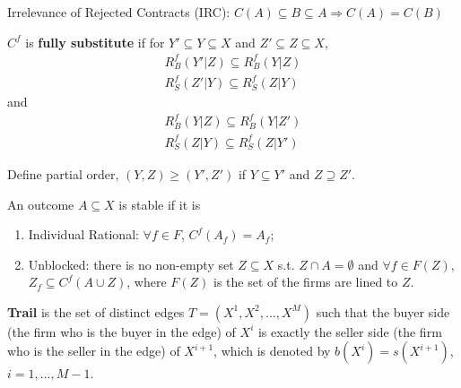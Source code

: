 \documentclass[11pt]{elegantbook}
\begin{document}
\begin{definition}
    \normalfont
    Irrelevance of Rejected Contracts (IRC): $C(A)\subseteq B\subseteq A \Rightarrow C(A)=C(B)$
\end{definition}

\begin{definition}
    \normalfont
    $C^f$ is \textbf{fully substitute} if for $Y'\subseteq Y\subseteq X$ and $Z'\subseteq Z\subseteq X$,
    \begin{equation}
        \begin{aligned}
            R_B^f(Y'|Z)\subseteq R_B^f(Y|Z)\\
            R_S^f(Z'|Y)\subseteq R_S^f(Z|Y)
        \end{aligned}
        \nonumber
    \end{equation}
    and
    \begin{equation}
        \begin{aligned}
            R_B^f(Y|Z)\subseteq R_B^f(Y|Z')\\
            R_S^f(Z|Y)\subseteq R_S^f(Z|Y')
        \end{aligned}
        \nonumber
    \end{equation}
\end{definition}
Define partial order, $(Y,Z)\geq (Y',Z')$ if $Y\subseteq Y'$ and $Z\supseteq  Z'$.


\begin{definition}
    \normalfont
    An outcome $A\subseteq X$ is stable if it is
    \begin{enumerate}
        \item Individual Rational: $\forall f\in F$, $C^f (A_f)=A_f$;
        \item Unblocked: there is no non-empty set $Z\subseteq X$ s.t. $Z\cap A=\emptyset$ and $\forall f\in F(Z)$, $Z_f\subseteq C^f(A\cup Z)$, where $F(Z)$ is the set of the firms are lined to $Z$.
    \end{enumerate}
\end{definition}

\begin{definition}[Trail]
    \normalfont
    \textbf{Trail} is the set of distinct edges $T=(X^1,X^2,...,X^M)$ such that the buyer side (the firm who is the buyer in the edge) of $X^i$ is exactly the seller side (the firm who is the seller in the edge) of $X^{i+1}$, which is denoted by $b(X^i)=s(X^{i+1})$, $i=1,...,M-1$.
\end{definition}
\end{document}
